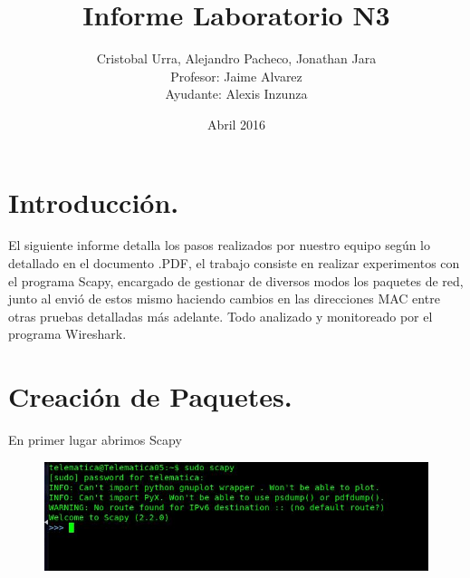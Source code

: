 \documentclass{udpreport}
\title{Informe Laboratorio N3}
\author{Cristobal Urra, Alejandro Pacheco, Jonathan Jara\\Profesor: Jaime Alvarez\\Ayudante: Alexis Inzunza}
\date{Abril 2016}
\begin{document}
\maketitle

\tableofcontents
\chapter{Introducción.}
El siguiente informe detalla los pasos realizados por nuestro equipo según lo detallado en el documento .PDF, el trabajo consiste en realizar experimentos con el programa Scapy, encargado de gestionar de diversos modos los paquetes de red, junto al envió de estos mismo haciendo cambios en las direcciones MAC entre otras pruebas detalladas más adelante. Todo analizado y monitoreado por el programa Wireshark.
\chapter{Creación de Paquetes.}
En primer lugar abrimos Scapy 
\begin{figure}[H]
    \centering
    \includegraphics[scale=0.7]{images/ppaso1.png}
    \label{fig:my_label}
\end{figure}
\end{document}
